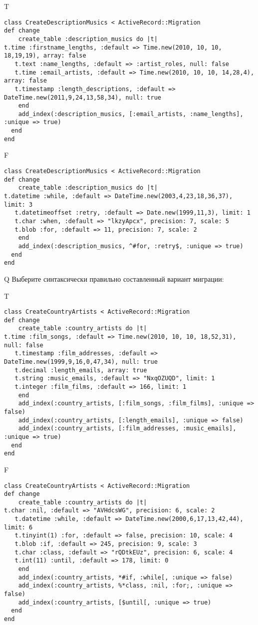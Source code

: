 T
\begin{verbatim}
class CreateDescriptionMusics < ActiveRecord::Migration
def change
	create_table :description_musics do |t|
t.time :firstname_lengths, :default => Time.new(2010, 10, 10, 18,19,19), array: false
   t.text :name_lengths, :default => :artist_roles, null: false
   t.time :email_artists, :default => Time.new(2010, 10, 10, 14,28,4), array: false
   t.timestamp :length_descriptions, :default => DateTime.new(2011,9,24,13,58,34), null: true
   	end
	add_index(:description_musics, [:email_artists, :name_lengths], :unique => true)
  end 
end

\end{verbatim}

F
\begin{verbatim}
class CreateDescriptionMusics < ActiveRecord::Migration
def change
	create_table :description_musics do |t|
t.datetime :while, :default => DateTime.new(2003,4,23,18,36,37), limit: 3
   t.datetimeoffset :retry, :default => Date.new(1999,11,3), limit: 1
   t.char :when, :default => "lkzyApcx", precision: 7, scale: 5
   t.blob :for, :default => 11, precision: 7, scale: 2
   	end
	add_index(:description_musics, ^#for, :retry$, :unique => true)
  end 
end

\end{verbatim}

Q
Выберите синтаксически правильно составленный вариант миграции:

T
\begin{verbatim}
class CreateCountryArtists < ActiveRecord::Migration
def change
	create_table :country_artists do |t|
t.time :film_songs, :default => Time.new(2010, 10, 10, 18,52,31), null: false
   t.timestamp :film_addresses, :default => DateTime.new(1999,9,16,0,47,34), null: true
   t.decimal :length_emails, array: true
   t.string :music_emails, :default => "NxqOZUQD", limit: 1
   t.integer :film_films, :default => 166, limit: 1
   	end
	add_index(:country_artists, [:film_songs, :film_films], :unique => false)
	add_index(:country_artists, [:length_emails], :unique => false)
	add_index(:country_artists, [:film_addresses, :music_emails], :unique => true)
  end 
end

\end{verbatim}

F
\begin{verbatim}
class CreateCountryArtists < ActiveRecord::Migration
def change
	create_table :country_artists do |t|
t.char :nil, :default => "AVHdcsWG", precision: 6, scale: 2
   t.datetime :while, :default => DateTime.new(2000,6,17,13,42,44), limit: 6
   t.tinyint(1) :for, :default => false, precision: 10, scale: 4
   t.blob :if, :default => 245, precision: 9, scale: 3
   t.char :class, :default => "rQDtkEUz", precision: 6, scale: 4
   t.int(11) :until, :default => 178, limit: 0
   	end
	add_index(:country_artists, *#if, :while[, :unique => false)
	add_index(:country_artists, %*class, :nil, :for;, :unique => false)
	add_index(:country_artists, [$until[, :unique => true)
  end 
end

\end{verbatim}

